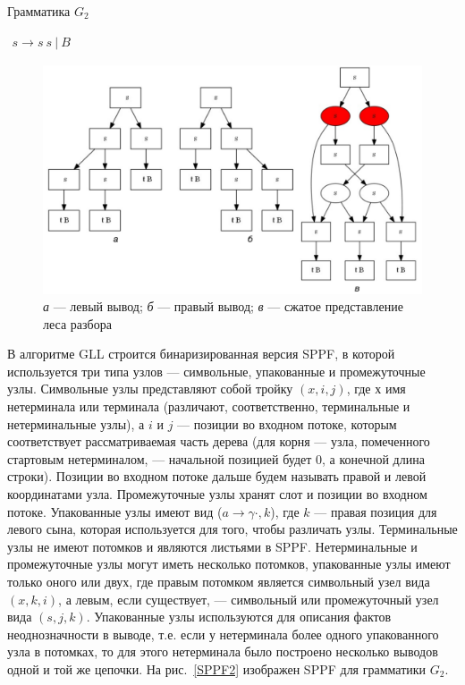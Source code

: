 \begin{listing}
\caption{Грамматика $G_2$}
\label{grmG2}
\centering
$\begin{array}{rl}
s \rightarrow s \ s \ | \ B
\end{array}$
\end{listing}

\begin{figure}
 \centering
 \includegraphics[width=\textwidth]{Ragozina/pics/SPPF1.pdf}
 \caption{{\it а} --- левый вывод; {\it б} --- правый вывод; {\it в} --- сжатое представление леса разбора }
 \label{SPPF1}
\end{figure}

В алгоритме GLL строится бинаризированная версия SPPF, в которой используется три типа узлов --- символьные, упакованные и промежуточные узлы. Символьные узлы представляют собой тройку $(x, i , j)$, где $х$ имя нетерминала или терминала (различают, соответственно, терминальные и нетерминальные узлы), а $i$ и $j$ --- позиции во входном потоке, которым соответствует рассматриваемая часть дерева (для корня --- узла, помеченного стартовым нетерминалом, --- начальной позицией будет 0, а конечной длина строки). Позиции во входном потоке дальше будем называть правой и левой координатами узла. Промежуточные узлы хранят слот и позиции во входном потоке. Упакованные узлы имеют вид ($ a \rightarrow \gamma \cdot, k$), где $k$ --- правая позиция для левого сына, которая используется для того, чтобы различать узлы. Терминальные узлы не имеют потомков и являются листьями в SPPF. Нетерминальные и промежуточные узлы могут иметь несколько потомков, упакованные узлы имеют только оного или двух, где правым потомком является символьный узел вида $(x, k, i)$, а левым, если существует, --- символьный или промежуточный узел вида $(s, j, k)$. Упакованные узлы используются для описания фактов неоднозначности в выводе, т.е. если у нетерминала более одного упакованного узла в потомках, то для этого нетерминала было построено несколько выводов одной и той же цепочки. На рис.~\ref{SPPF2} изображен SPPF для грамматики $G_2$.


